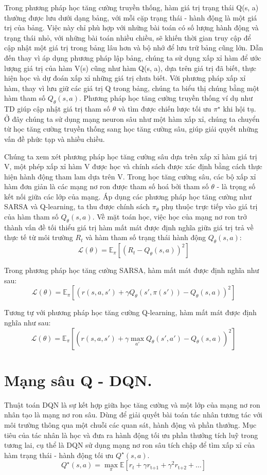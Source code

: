\documentclass{uetgraduation}
\begin{document}
Trong phương pháp học tăng cường truyền thống, hàm giá trị trạng thái Q(s, a) thường được lưu dưới dạng bảng, với mỗi cặp trạng thái - hành động là một giá trị của bảng. Việc này
chỉ phù hợp với những bài toán có số lượng hành động và trạng thái nhỏ, với những bài toán nhiều chiều, sẽ khiến thời gian truy cập để cập nhật một giá trị trong bảng lâu hơn và bộ nhớ để
lưu trữ bảng cũng lớn. Dẫn đến thay vì áp dụng phương pháp lập bảng, chúng ta sử dụng xấp xỉ hàm để ước lượng giá trị của hàm V(s) cũng như hàm Q(s, a), dựa trên giá trị đã biết, thực hiện 
học và dự đoán xấp xỉ những giá trị chưa biết. Với phương pháp xấp xỉ hàm, thay vì lưu giữ các giá trị Q trong bảng, chúng ta biểu thị chúng bằng một hàm tham số $Q_\theta (s, a)$. Phương
pháp học tăng cường truyền thống ví dụ như TD giúp cập nhật giá trị tham số $\theta$ và tìm được chiến lược tối ưu $\pi^\star$ khi hội tụ. Ở đây chúng ta sử dụng mạng neuron sâu như một hàm
xấp xỉ, chúng ta chuyển từ học tăng cường truyền thống sang học tăng cường sâu, giúp giải quyết những vấn đề phức tạp và nhiều chiều.

Chúng ta xem xét phương pháp học tăng cường sâu dựa trên xấp xỉ hàm giá trị V, một phép xấp xỉ hàm V được học và chính sách được xác định bằng cách thực hiện hành động tham lam dựa trên V.
Trong học tăng cường sâu, các bộ xấp xỉ hàm đơn giản là các mạng nơ ron được tham số hoá bởi tham số $\theta$ - là trọng số kết nối giữa các lớp của mạng. Áp dụng các phương pháp học tăng
cường như SARSA và Q-learning, ta thu được chính sách $\pi_\theta$ phụ thuộc trực tiếp vào giá trị của hàm tham số $Q_\theta (s, a)$. Về mặt toán học, việc học của mạng nơ ron trở thành
vấn đề tối thiểu giá trị hàm mất mát được định nghĩa giữa giá trị trả về thực tế từ môi trường $R_t$ và hàm tham số trạng thái hành động $Q_\theta (s, a)$:
\[
\mathcal{L(\theta)} = \mathbb{E}_\pi [(R_t - Q_\theta (s, a))^2]
\]

Trong phương pháp học tăng cường SARSA, hàm mất mát được định nghĩa như sau:
\[
\mathcal{L(\theta)} = \mathbb{E}_\pi [(r(s, a, s') + \gamma Q_\theta (s', \pi(s')) - Q_\theta (s, a))^2]
\]

Tương tự với phương pháp học tăng cường Q-learning, hàm mất mát được định nghĩa như sau:
\[
\mathcal{L(\theta)} = \mathbb{E}_\pi [(r(s, a, s') + \gamma \max_{a'} Q_\theta (s', a') - Q_\theta (s, a))^2]
\]

\section{Mạng sâu Q - DQN.}
Thuật toán DQN là sự kết hợp giữa học tăng cường và một lớp của mạng nơ ron nhân tạo là mạng nơ ron sâu. Dùng để giải quyết bài toán tác nhân tương tác với môi trường thông qua một
chuỗi các quan sát, hành động và phần thưởng. Mục tiêu của tác nhân là học và đưa ra hành động tối ưu phần thưởng tích luỹ trong tương lai, cụ thể là DQN sử dụng mạng nơ ron sâu tích chập
để tìm xấp xỉ của hàm trạng thái - hành động tối ưu $Q^\star (s, a)$.
\[
Q^\star (s, a) = \max_{\pi} \mathbb{E} [r_t + \gamma r_\text{t+1} + \gamma^2 r_\text{t+2} + \dots]
\]
\end{document}
